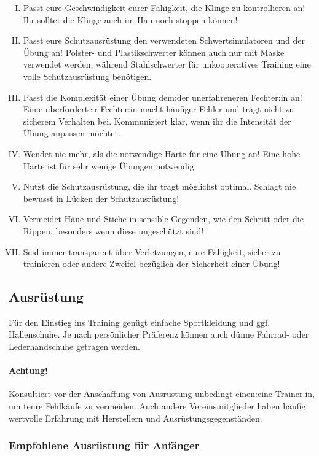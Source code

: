 \begin{enumerate}[I.]
    \item Passt eure Geschwindigkeit eurer Fähigkeit, die Klinge zu kontrollieren an!
        Ihr solltet die Klinge auch im Hau noch stoppen können!
    \item Passt eure Schutzausrüstung den verwendeten Schwertsimulatoren und der Übung an!
        Polster- und Plastikschwerter können auch nur mit Maske verwendet werden, während Stahlschwerter für unkooperatives Training eine volle Schutzausrüstung benötigen.
    \item Passt die Komplexität einer Übung dem:der unerfahreneren Fechter:in an!
        Ein:e überforderte:r Fechter:in macht häufiger Fehler und trägt nicht zu sicherem Verhalten bei.
        Kommuniziert klar, wenn ihr die Intensität der Übung anpassen möchtet.
    \item Wendet nie mehr, als die notwendige Härte für eine Übung an!
        Eine hohe Härte ist für sehr wenige Übungen notwendig.
    \item Nutzt die Schutzausrüstung, die ihr tragt möglichst optimal.
        Schlagt nie bewusst in Lücken der Schutzausrüstung!
    \item Vermeidet Häue und Stiche in sensible Gegenden, wie den Schritt oder die Rippen, besonders wenn diese ungeschützt sind!
    \item Seid immer transparent über Verletzungen, eure Fähigkeit, sicher zu trainieren oder andere Zweifel bezüglich der Sicherheit einer Übung!
\end{enumerate}

\newpage

\subsection{Ausrüstung}

Für den Einstieg ins Training genügt einfache Sportkleidung und ggf. Hallenschuhe.
Je nach persönlicher Präferenz können auch dünne Fahrrad- oder Lederhandschuhe getragen werden.

\paragraph{Achtung!}
Konsultiert vor der Anschaffung von Ausrüstung unbedingt einen:eine Trainer:in, um teure Fehlkäufe zu vermeiden.
Auch andere Vereinsmitglieder haben häufig wertvolle Erfahrung mit Herstellern und Ausrüstungsgegenständen.

\subsubsection*{\hspace{3.75cm}Empfohlene Ausrüstung für Anfänger}

